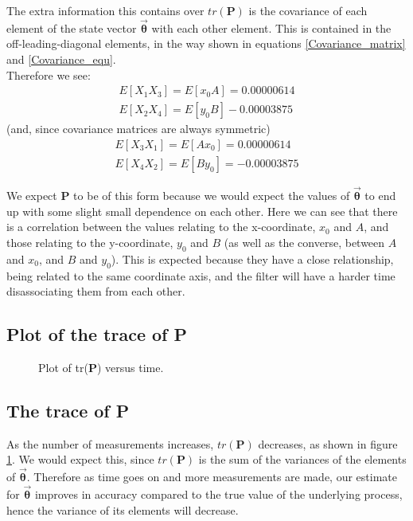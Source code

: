 \documentclass[a4paper]{article}
\begin{document}
	\noindent The extra information this contains over $tr(\bm{P})$ is the covariance of each element of the state vector $\bm{\vec{\theta}}$ with each other element. This is contained in the off-leading-diagonal elements, in the way shown in equations \ref{Covariance_matrix} and \ref{Covariance_equ}.\\
	
	Therefore we see:
	\begin{align}
		E[X_1X_3]=E[x_0A]=0.00000614\\
		E[X_2X_4]=E[y_0B]-0.00003875
	\end{align}
		(and, since covariance matrices are always symmetric)
	\begin{align}
		E[X_3X_1]=E[Ax_0]=0.00000614\\
		E[X_4X_2]=E[By_0]=-0.00003875
	\end{align}
	
	We expect $\bm{P}$ to be of this form because we would expect the values of $\bm{\vec{\theta}}$ to end up with some slight small dependence on each other. Here we can see that there is a correlation between the values relating to the x-coordinate, $x_0$ and $A$, and those relating to the y-coordinate, $y_0$ and $B$ (as well as the converse, between $A$ and $x_0$, and $B$ and $y_0$). This is expected because they have a close relationship, being related to the same coordinate axis, and the filter will have a harder time disassociating them from each other.
	
	\clearpage
	\subsection{Plot of the trace of P}\label{Plot_trace_of_P}
	\begin{figure}[ht!]
		\centering
		
		\caption{Plot of tr($\bm{P}$) versus time.}\label{Fig_tr_P_plot}
	\end{figure}	
	
	\clearpage
	\subsection{The trace of P}\label{Trace_of_P_plot}
	As the number of measurements increases, $tr(\bm{P})$ decreases, as shown in figure \ref{Fig_tr_P_plot}. We would expect this, since $tr(\bm{P})$ is the sum of the variances of the elements of $\bm{\vec{\theta}}$. Therefore as time goes on and more measurements are made, our estimate for $\bm{\vec{\theta}}$ improves in accuracy compared to the true value of the underlying process, hence the variance of its elements will decrease.
\end{document}
